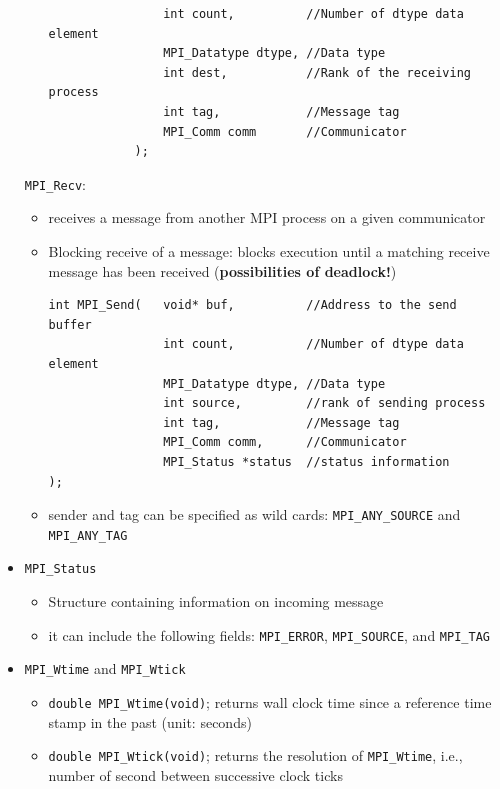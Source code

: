 \documentclass[12pt, a4paper]{report}
\begin{document}
\begin{itemize}
\begin{itemize}
\begin{verbatim}
                int count,          //Number of dtype data element
                MPI_Datatype dtype, //Data type
                int dest,           //Rank of the receiving process
                int tag,            //Message tag
                MPI_Comm comm       //Communicator
            );
\end{verbatim}
    \end{itemize}
    \verb$MPI_Recv$:
    \begin{itemize}
        \item receives a message from another MPI process on a given communicator
        \item Blocking receive of a message: blocks execution until a matching receive message has been received ({\bfseries{possibilities of deadlock!}})
\begin{verbatim}
int MPI_Send(   void* buf,          //Address to the send buffer
                int count,          //Number of dtype data element
                MPI_Datatype dtype, //Data type
                int source,         //rank of sending process
                int tag,            //Message tag
                MPI_Comm comm,      //Communicator
                MPI_Status *status  //status information
);    
\end{verbatim}
        \item sender and tag can be specified as wild cards: \verb$MPI_ANY_SOURCE$ and \verb$MPI_ANY_TAG$
    \end{itemize}
    \item \verb$MPI_Status$
    \begin{itemize}
        \item Structure containing information on incoming message
        \item it can include the following fields: \verb$MPI_ERROR$, \verb$MPI_SOURCE$, and \verb$MPI_TAG$
    \end{itemize} 
    \item \verb$MPI_Wtime$ and \verb$MPI_Wtick$
    \begin{itemize}
        \item \verb$double MPI_Wtime(void)$; returns wall clock time since a reference time stamp in the past (unit: seconds)
        \item \verb$double MPI_Wtick(void)$; returns the resolution of \verb$MPI_Wtime$, i.e., number of second between successive clock ticks
    \end{itemize}
\end{itemize}
\end{document}
